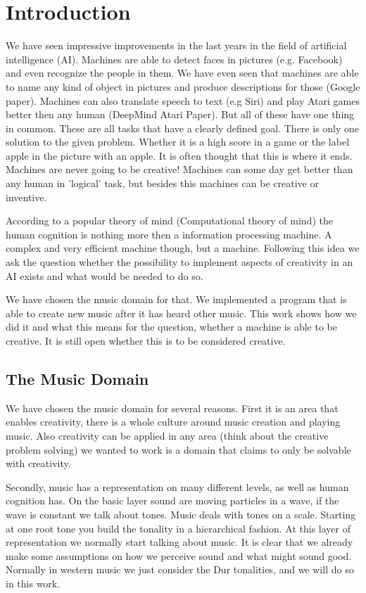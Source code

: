 \section{Introduction} 
We have seen impressive improvements in the last years in the field of artificial intelligence (AI). Machines are able to detect faces in pictures (e.g. Facebook) and even recognize the people in them. We have even seen that machines are able to name any kind of object in pictures and produce descriptions for those (Google paper). Machines can also translate speech to text (e.g Siri) and play Atari games better then any human (DeepMind Atari Paper). But all of these have one thing in common. These are all tasks that have a clearly defined goal. There is only one solution to the given problem. Whether it is a high score in a game or the label apple in the picture with an apple. It is often thought that this is where it ends. Machines are never going to be creative! Machines can some day get better than any human in 'logical' task, but besides this machines can be creative or inventive. 

According to a popular theory of mind (Computational theory of mind) 
the human cognition is nothing more then a information processing machine. A complex and very efficient machine though, but a machine. Following this idea we ask the question whether the possibility to implement aspects of creativity in an AI exists and what would be needed to do so.   

We have chosen the music domain for that. We implemented a program that is able to create new music after it has heard other music. This work shows how we did it and what this means for the question, whether a machine is able to be creative. It is still open whether this is to be considered creative. 

\subsection{The Music Domain}
We have chosen the music domain for several reasons. First it is an area that enables creativity, there is a whole culture around music creation and playing music. Also creativity can be applied in any area (think about the creative problem solving) we wanted to work is a domain that claims to only be solvable with creativity. 

Secondly, music has a representation on many different levels, as well as human cognition has. On the basic layer sound are moving particles in a wave, if the wave is constant we talk about tones. Music deals with tones on a scale. Starting at one root tone you build the tonality in a hierarchical fashion. At this layer of representation we normally start talking about music. It is clear that we already make some assumptions on how we perceive sound and what might sound good. Normally in western music we just consider the Dur tonalities, and we will do so in this work. 

